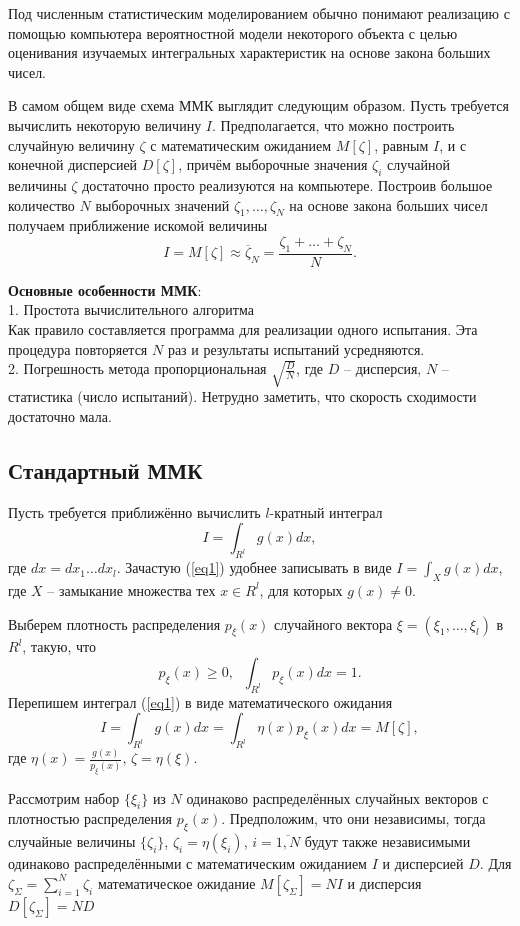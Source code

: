 \documentclass[
11pt,
master, %
subf, %
href, %
colorlinks=true, %
times, %
]{disser}
\begin{document}
Под численным статистическим моделированием обычно понимают реализацию с помощью компьютера вероятностной модели некоторого объекта с целью оценивания изучаемых интегральных характеристик на основе закона больших чисел.

В самом общем виде схема ММК выглядит следующим образом. Пусть требуется вычислить некоторую величину $I$. Предполагается, что можно построить случайную величину $\zeta$ с математическим ожиданием $M[\zeta]$, равным $I$, и с конечной дисперсией $D[\zeta]$, причём выборочные значения $\zeta_i$ случайной величины $\zeta$ достаточно просто реализуются на компьютере. Построив большое количество $N$ выборочных значений $\zeta_1,\ldots,\zeta_N$ на основе закона больших чисел получаем приближение искомой величины
$$I = M[\zeta] \approx \overline{\zeta}_N = \frac{\zeta_1 + \ldots + \zeta_N}{N}.$$

\textbf{Основные особенности ММК}:\\
1. Простота вычислительного алгоритма\\
Как правило составляется программа для реализации одного испытания. Эта процедура повторяется $N$ раз и результаты испытаний усредняются.\\
2. Погрешность метода пропорциональная $\sqrt{\frac{D}{N}}$, где $D$ -- дисперсия, $N$ -- статистика (число испытаний). Нетрудно заметить, что скорость сходимости достаточно мала.

\subsection{Стандартный ММК}
Пусть требуется приближённо вычислить $l$-кратный интеграл
\begin{equation}\label{eq1}
  I = \int_{R^l} g(x)dx,
\end{equation}
где $dx = dx_1 \ldots dx_l$. Зачастую (\ref{eq1}) удобнее записывать в виде $I =\int_{X} g(x) dx$, где $X$ -- замыкание множества тех $x\in R^l$, для которых $g(x)\neq 0$.

Выберем плотность распределения $p_{\xi}(x)$ случайного вектора $\xi =(\xi_1,\ldots,\xi_l)$ в $R^l$, такую, что
$$p_{\xi}(x)\geq 0,\;\; \int_{R^l} p_{\xi}(x)dx = 1.$$
Перепишем интеграл (\ref{eq1}) в виде математического ожидания
\begin{equation}\label{eq2}
  I = \int_{R^l}g(x) dx = \int_{R^l}\eta(x)p_{\xi}(x)dx = M[\zeta],
\end{equation}
где $\eta(x) = \frac{g(x)}{p_{\xi}(x)}$, $\zeta = \eta(\xi).$

Рассмотрим набор $\{\xi_i\}$ из $N$ одинаково распределённых случайных векторов с плотностью распределения $p_{\xi}(x)$. Предположим, что они независимы, тогда случайные величины $\{\zeta_i\}$, $\zeta_i = \eta(\xi_i)$, $i=\overline{1,N}$ будут также независимыми одинаково распределёнными с математическим ожиданием $I$ и дисперсией $D$. Для $\zeta_{\Sigma} = \sum_{i=1}^{N} \zeta_i$ математическое ожидание $M[\zeta_{\Sigma}] = NI$ и дисперсия $D[\zeta_{\Sigma}] = ND$
\end{document}
